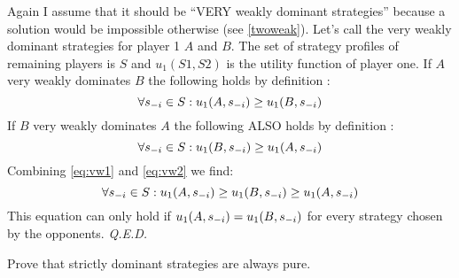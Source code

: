 \documentclass[../main.tex]{subfiles}
\begin{document}
\begin{solution}
	Again I assume that it should be ``VERY weakly dominant strategies'' because a solution would be impossible otherwise (see \autoref{twoweak}).
	Let's call the very weakly dominant strategies for player 1 $A$ and $B$.
	The set of strategy profiles of remaining players is $S$ and $u_1(S1,S2)$ is the utility function of player one.
	If $A$ very weakly dominates $B$ the following holds by definition :
	\begin{equation}
		\label{eq:vw1}
		\forall s_{\--i} \in S : u_1(A,s_{\--i}) \geq u_1(B,s_{\--i})
	\end{equation}
	If $B$ very weakly dominates $A$ the following ALSO holds by definition :
	\begin{equation}
		\label{eq:vw2}
		\forall s_{\--i} \in S : u_1(B,s_{\--i}) \geq u_1(A,s_{\--i})
	\end{equation}
	Combining \autoref{eq:vw1} and \autoref{eq:vw2} we find:
	\begin{equation}
		\forall s_{\--i} \in S : u_1(A,s_{\--i}) \geq u_1(B,s_{\--i}) \geq u_1(A,s_{\--i})
	\end{equation}
	This equation can only hold if $u_1(A,s_{\--i}) = u_1(B,s_{\--i})$ for every strategy chosen by the opponents. \textit{Q.E.D.}
\end{solution}

\begin{question}
	Prove that strictly dominant strategies are always pure. 
\end{question}
\end{document}
